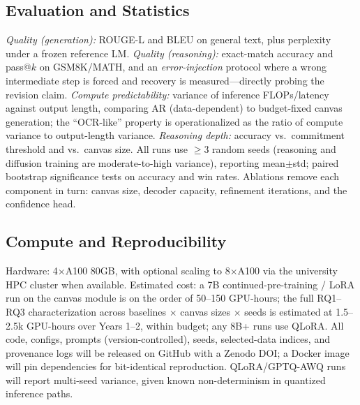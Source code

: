 \documentclass[11pt,a4paper]{article}
\begin{document}
\subsection{Evaluation and Statistics}
\emph{Quality (generation):} ROUGE-L and BLEU on general text, plus perplexity under a frozen reference LM. \emph{Quality (reasoning):} exact-match accuracy and pass@$k$ on GSM8K/MATH, and an \emph{error-injection} protocol where a wrong intermediate step is forced and recovery is measured---directly probing the revision claim. \emph{Compute predictability:} variance of inference FLOPs/latency against output length, comparing AR (data-dependent) to budget-fixed canvas generation; the ``OCR-like'' property is operationalized as the ratio of compute variance to output-length variance. \emph{Reasoning depth:} accuracy vs.\ commitment threshold and vs.\ canvas size. All runs use $\geq$3 random seeds (reasoning and diffusion training are moderate-to-high variance), reporting mean$\pm$std; paired bootstrap significance tests on accuracy and win rates. Ablations remove each component in turn: canvas size, decoder capacity, refinement iterations, and the confidence head.

\subsection{Compute and Reproducibility}
Hardware: 4$\times$A100 80GB, with optional scaling to 8$\times$A100 via the university HPC cluster when available. Estimated cost: a 7B continued-pre-training / LoRA run on the canvas module is on the order of 50--150 GPU-hours; the full RQ1--RQ3 characterization across baselines $\times$ canvas sizes $\times$ seeds is estimated at 1.5--2.5k GPU-hours over Years 1--2, within budget; any 8B+ runs use QLoRA. All code, configs, prompts (version-controlled), seeds, selected-data indices, and provenance logs will be released on GitHub with a Zenodo DOI; a Docker image will pin dependencies for bit-identical reproduction. QLoRA/GPTQ-AWQ runs will report multi-seed variance, given known non-determinism in quantized inference paths.
\end{document}
